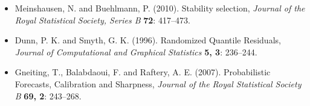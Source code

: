 \documentclass[american,foldmarks=false,noconfig]{uibklttr}
\begin{document}
\begin{itemize}[leftmargin=*]
\item[] Meinshausen, N. and Buehlmann, P. (2010). 
Stability selection,
\textit{Journal of the Royal Statistical Society, Series B} 
\textbf{72}: 417--473.

\item[] Dunn, P. K. and Smyth, G. K. (1996).
Randomized Quantile Residuals,
\textit{Journal of Computational and Graphical Statistics}
\textbf{5, 3}: 236--244.

\item[] Gneiting, T., Balabdaoui, F. and Raftery, A. E. (2007).
Probabilistic Forecasts, Calibration and Sharpness,
\textit{Journal of the Royal Statistical Society B}
\textbf{69, 2}: 243--268.

\end{itemize}
\end{document}
